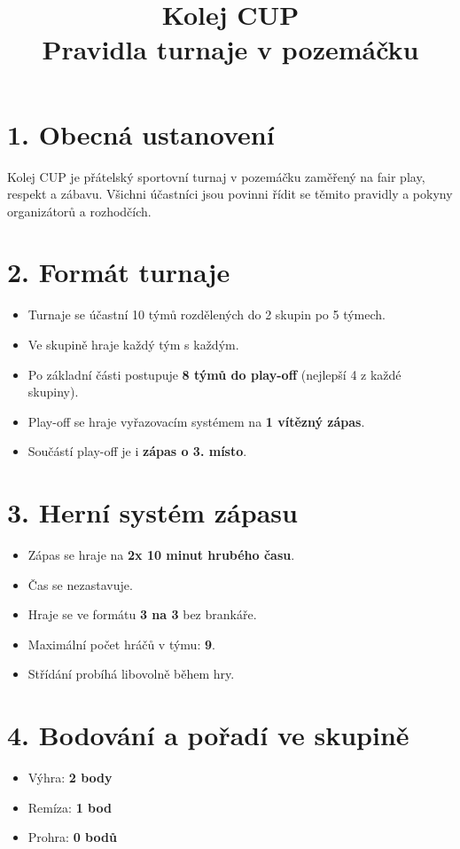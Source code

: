 \documentclass[a4paper,12pt]{article}
\title{\textbf{Kolej CUP}\\
Pravidla turnaje v pozemáčku}
\date{}
\begin{document}
\maketitle

\section*{1. Obecná ustanovení}
Kolej CUP je přátelský sportovní turnaj v pozemáčku zaměřený na fair play, respekt a zábavu. 
Všichni účastníci jsou povinni řídit se těmito pravidly a pokyny organizátorů a rozhodčích.

\section*{2. Formát turnaje}
\begin{itemize}
    \item Turnaje se účastní 10 týmů rozdělených do 2 skupin po 5 týmech.
    \item Ve skupině hraje každý tým s každým.
    \item Po základní části postupuje \textbf{8 týmů do play-off} (nejlepší 4 z každé skupiny).
    \item Play-off se hraje vyřazovacím systémem na \textbf{1 vítězný zápas}.
    \item Součástí play-off je i \textbf{zápas o 3. místo}.
\end{itemize}

\section*{3. Herní systém zápasu}
\begin{itemize}
    \item Zápas se hraje na \textbf{2x 10 minut hrubého času}.
    \item Čas se nezastavuje.
    \item Hraje se ve formátu \textbf{3 na 3} bez brankáře.
    \item Maximální počet hráčů v týmu: \textbf{9}.
    \item Střídání probíhá libovolně během hry.
\end{itemize}

\section*{4. Bodování a pořadí ve skupině}
\begin{itemize}
    \item Výhra: \textbf{2 body}
    \item Remíza: \textbf{1 bod}
    \item Prohra: \textbf{0 bodů}
\end{itemize}
\end{document}
